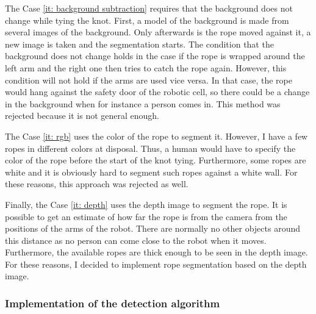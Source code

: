             The Case \ref{it: background subtraction} requires that the background does not change while tying the knot. First, a model of the background is made from several images of the background. Only afterwards is the rope moved against it, a new image is taken and the segmentation starts. The condition that the background does not change holds in the case if the rope is wrapped around the left arm and the right one then tries to catch the rope again. However, this condition will not hold if the arms are used vice versa. In that case, the rope would hang against the safety door of the robotic cell, so there could be a change in the background when for instance a person comes in. This method was rejected because it is not general enough.

            The Case \ref{it: rgb} uses the color of the rope to segment it. However, I have a few ropes in different colors at disposal. Thus, a human would have to specify the color of the rope before the start of the knot tying. Furthermore, some ropes are white and it is obviously hard to segment such ropes against a white wall. For these reasons, this approach was rejected as well.

            Finally, the Case \ref{it: depth} uses the depth image to segment the rope. It is possible to get an estimate of how far the rope is from the camera from the positions of the arms of the robot. There are normally no other objects around this distance as no person can come close to the robot when it moves. Furthermore, the available ropes are thick enough to be seen in the depth image. For these reasons, I decided to implement rope segmentation based on the depth image.

        \subsubsection{Implementation of the detection algorithm}

